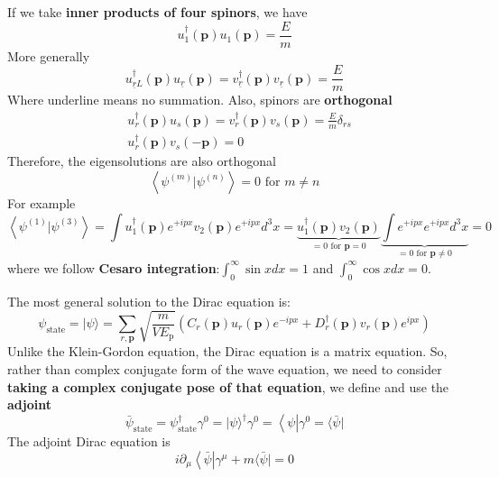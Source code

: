 If we take \textbf{inner products of four spinors}, we have
$$
u_{1}^{\dagger}(\mathbf{p}) u_{1}(\mathbf{p})=\frac{E}{m}
$$
More generally
\begin{equation}
u_{\underline{r}L}^{\dagger}(\mathbf{p}) u_{\underline{r}}(\mathbf{p})=v_{\underline{r}}^{\dagger}(\mathbf{p}) v_{\underline{r}}(\mathbf{p})=\frac{E}{m}
\end{equation}
Where underline means no summation. Also, spinors are \textbf{orthogonal}
\begin{equation}
\begin{aligned}
&u_{r}^{\dagger}(\mathbf{p}) u_{s}(\mathbf{p})=v_{r}^{\dagger}(\mathbf{p}) v_{s}(\mathbf{p})=\frac{E}{m} \delta_{r s}\\
&u_{r}^{\dagger}(\mathbf{p}) v_{s}(-\mathbf{p})=0
\end{aligned}
\end{equation}
Therefore, the eigensolutions are also orthogonal
\begin{equation}
\left\langle\psi^{(m)} | \psi^{(n)}\right\rangle= 0 \text { for } m \neq n
\end{equation}
For example
$$
\left\langle\psi^{(1)} | \psi^{(3)}\right\rangle=\int u_{1}^{\dagger}(\mathbf{p}) e^{+i p x} v_{2}(\mathbf{p}) e^{+i p x} d^{3} x=\underbrace{u_{1}^{\dagger}(\mathbf{p}) v_{2}(\mathbf{p})}_{=0 \text { for } \mathbf{p}=0} \underbrace{\int e^{+i p x} e^{+i p x} d^{3} x}_{=0 \text { for } \mathbf{p} \neq 0}=0
$$
where we follow \textbf{Cesaro integration}:$\int_{0}^{\infty} \sin x d x=1$ and $\int_{0}^{\infty} \cos x d x=0$.
\begin{qt}
The most general solution to the Dirac equation is:
\begin{equation}
\psi_{\text {state}}=|\psi\rangle=\sum_{r, \mathbf{p}} \sqrt{\frac{m}{V E_{\mathrm{p}}}}\left(C_{r}(\mathbf{p}) u_{r}(\mathbf{p}) e^{-i p x}+D_{r}^{\dagger}(\mathbf{p}) v_{r}(\mathbf{p}) e^{i p x}\right)
\label{general-Dirac-state}
\end{equation}
Unlike the Klein-Gordon equation, the Dirac equation is a matrix equation. So, rather than complex conjugate form of the wave equation, we need to consider \textbf{taking a complex conjugate pose of that equation}, we define  and use the \textbf{adjoint}
\begin{equation}
\bar{\psi}_{\text {state}}=\psi_{\text {state}}^{\dagger} \gamma^{0}=|\psi\rangle^{\dagger} \gamma^{0}=\left\langle\psi\left|\gamma^{0}=\langle\bar{\psi}|\right.\right.
\end{equation}
 The adjoint Dirac equation is
\begin{equation}
i \partial_{\mu}\left\langle\bar{\psi}\left|\gamma^{\mu}+m\langle\bar{\psi}|=0\right.\right.
\label{adjoint-Dirac-eq}
\end{equation}
\end{qt}
